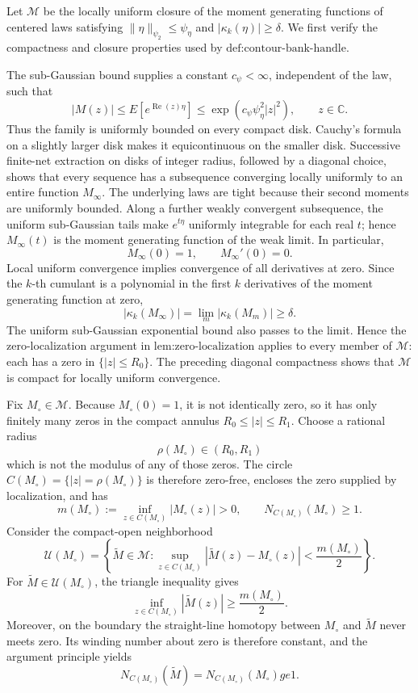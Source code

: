 Let \(\mathscr M\) be the locally uniform closure of the moment generating functions of centered laws satisfying \(\lVert\eta\rVert_{\psi_2}\le\psi_\eta\) and \(\lvert\kappa_k(\eta)\rvert\ge\delta\).  We first verify the compactness and closure properties used by \(\text{def:contour-bank-handle}\).

The sub-Gaussian bound supplies a constant \(c_\psi<\infty\), independent of the law, such that
\[
 |M(z)|
 \le E[e^{\operatorname{Re}(z)\eta}]
 \le\exp(c_\psi\psi_\eta^2|z|^2),
 \qquad z\in\mathbb C.
\]
Thus the family is uniformly bounded on every compact disk.  Cauchy's formula on a slightly larger disk makes it equicontinuous on the smaller disk.  Successive finite-net extraction on disks of integer radius, followed by a diagonal choice, shows that every sequence has a subsequence converging locally uniformly to an entire function \(M_\infty\).  The underlying laws are tight because their second moments are uniformly bounded.  Along a further weakly convergent subsequence, the uniform sub-Gaussian tails make \(e^{t\eta}\) uniformly integrable for each real \(t\); hence \(M_\infty(t)\) is the moment generating function of the weak limit.  In particular,
\[
 M_\infty(0)=1,
 \qquad
 M_\infty'(0)=0.
\]
Local uniform convergence implies convergence of all derivatives at zero.  Since the \(k\)-th cumulant is a polynomial in the first \(k\) derivatives of the moment generating function at zero,
\[
 |\kappa_k(M_\infty)|
 =\lim_m|\kappa_k(M_m)|\ge\delta.
\]
The uniform sub-Gaussian exponential bound also passes to the limit.  Hence the zero-localization argument in \(\text{lem:zero-localization}\) applies to every member of \(\mathscr M\): each has a zero in \(\{|z|\le R_0\}\).  The preceding diagonal compactness shows that \(\mathscr M\) is compact for locally uniform convergence.

Fix \(M_\circ\in\mathscr M\).  Because \(M_\circ(0)=1\), it is not identically zero, so it has only finitely many zeros in the compact annulus \(R_0\le|z|\le R_1\).  Choose a rational radius
\[
 \rho(M_\circ)\in(R_0,R_1)
\]
which is not the modulus of any of those zeros.  The circle \(C(M_\circ)=\{|z|=\rho(M_\circ)\}\) is therefore zero-free, encloses the zero supplied by localization, and has
\[
 m(M_\circ):=\inf_{z\in C(M_\circ)}|M_\circ(z)|>0,
 \qquad
 N_{C(M_\circ)}(M_\circ)\ge1.
\]
Consider the compact-open neighborhood
\[
 \mathcal U(M_\circ)
 =\left\{\widetilde M\in\mathscr M:
   \sup_{z\in C(M_\circ)}|\widetilde M(z)-M_\circ(z)|
   <\frac{m(M_\circ)}2
  \right\}.
\]
For \(\widetilde M\in\mathcal U(M_\circ)\), the triangle inequality gives
\[
 \inf_{z\in C(M_\circ)}|\widetilde M(z)|
 \ge\frac{m(M_\circ)}2.
\]
Moreover, on the boundary the straight-line homotopy between \(M_\circ\) and \(\widetilde M\) never meets zero.  Its winding number about zero is therefore constant, and the argument principle yields
\[
 N_{C(M_\circ)}(\widetilde M)
 =N_{C(M_\circ)}(M_\circ)ge1.
\]

